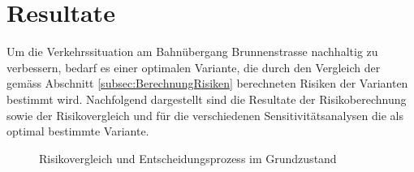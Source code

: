 %
%
%
%

\chapter{Resultate}
\label{chap:Resultate}

Um die Verkehrssituation am Bahnübergang Brunnenstrasse nachhaltig zu verbessern, bedarf es einer optimalen Variante, die durch den Vergleich der gemäss Abschnitt \ref{subsec:BerechnungRisiken} berechneten Risiken der Varianten bestimmt wird. 
Nachfolgend dargestellt sind die Resultate der Risikoberechnung sowie der Risikovergleich und für die verschiedenen Sensitivitätsanalysen die als optimal bestimmte Variante. 

\begin{figure}[h!]
  \centering
  \hfill
\caption[Risikovergleich Grundzustand]{Risikovergleich und Entscheidungsprozess im Grundzustand}
  \label{fig:Z0}
\end{figure}

